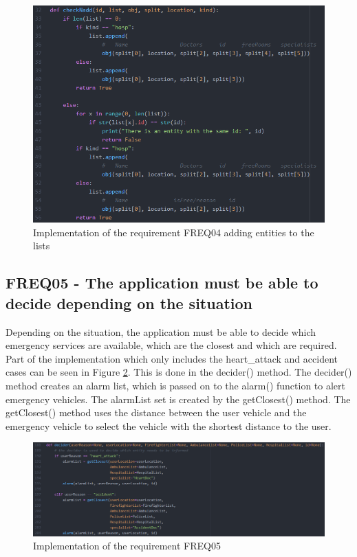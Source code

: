 \begin{figure}
\sidecaption
\includegraphics[scale=0.4]{images/walter/code/FREQ04-02.png}
\caption{Implementation of the requirement FREQ04 adding entities to the lists}
\label{FREQ042}
\end{figure}


\subsection{FREQ05 - The application must be able to decide depending on the situation}
Depending on the situation, the application must be able to decide which emergency services are available, which are the closest and which are required. Part of the implementation which only includes the heart\_attack and accident cases can be seen in Figure \ref{decider}. This is done in the decider() method. The decider() method creates an alarm list, which is passed on to the alarm() function to alert emergency vehicles. The alarmList set is created by the getClosest() method. The getClosest() method uses the distance between the user vehicle and the emergency vehicle to select the vehicle with the shortest distance to the user.

\begin{figure}
\sidecaption
\includegraphics[scale=0.4]{images/walter/code/decider.png}
\caption{Implementation of the requirement FREQ05}
\label{decider}
\end{figure}


